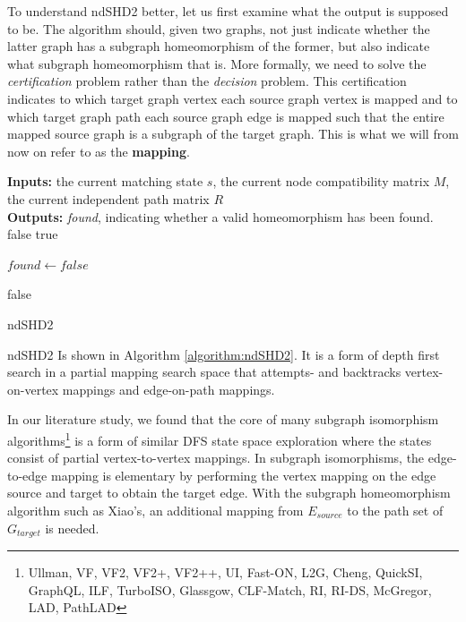 To understand ndSHD2 better, let us first examine what the output is supposed to be. The algorithm should, given two graphs, not just indicate whether the latter graph has a subgraph homeomorphism of the former, but also indicate what subgraph homeomorphism that is. More formally, we need to solve the \textit{certification} problem rather than the \textit{decision} problem. This certification indicates to which target graph vertex each source graph vertex is mapped and to which target graph path each source graph edge is mapped such that the entire mapped source graph is a subgraph of the target graph. This is what we will from now on refer to as the \textbf{mapping}.

\begin{algorithm}[H]
\SetAlgoLined
\textbf{Inputs: } the current matching state $s$, the current node compatibility matrix $M$, the current independent path matrix $R$\\
\textbf{Outputs: } \textit{found}, indicating whether a valid homeomorphism has been found.\\
 {
	\Return false\;
}  {
	\Return true\;
}

$\mathit{found} \longleftarrow \mathit{false}$

 \Return false\;
 \caption{ndSHD2}
 \label{algorithm:ndSHD2}
\end{algorithm}

ndSHD2 Is shown in Algorithm \ref{algorithm:ndSHD2}. It is a form of depth first search in a partial mapping search space that attempts- and backtracks vertex-on-vertex mappings and edge-on-path mappings.

In our literature study, we found that the core of many subgraph isomorphism algorithms\footnote{Ullman, VF, VF2, VF2+, VF2++, UI, Fast-ON, L2G, Cheng, QuickSI, GraphQL, ILF, TurboISO, Glassgow, CLF-Match, RI, RI-DS, McGregor, LAD, PathLAD} is a form of similar DFS state space exploration where the states consist of partial vertex-to-vertex mappings. In subgraph isomorphisms, the edge-to-edge mapping is elementary by performing the vertex mapping on the edge source and target to obtain the target edge. With the subgraph homeomorphism algorithm such as Xiao's, an additional mapping from $E_{source}$ to the path set of $G_{target}$ is needed.

